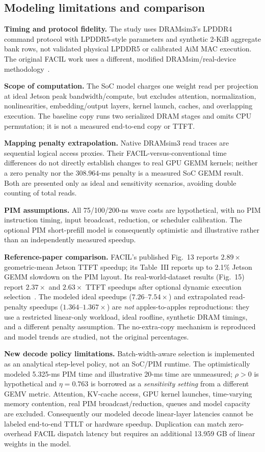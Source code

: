 \documentclass[conference,10pt]{IEEEtran}
\begin{document}
\subsection{Modeling limitations and comparison}
\textbf{Timing and protocol fidelity.} The study uses DRAMsim3's LPDDR4
command protocol with LPDDR5-style parameters and synthetic 2-KiB
aggregate bank rows, not validated physical LPDDR5 or calibrated
AiM MAC execution. The original FACIL work uses a different, modified
DRAMsim/real-device methodology~\cite{facil}.

\textbf{Scope of computation.} The SoC model charges one weight read
per projection at ideal Jetson peak bandwidth/compute, but excludes
attention, normalization, nonlinearities, embedding/output layers,
kernel launch, caches, and overlapping execution. The baseline copy
runs two serialized DRAM stages and omits CPU permutation; it is not a
measured end-to-end copy or TTFT.

\textbf{Mapping penalty extrapolation.} Native DRAMsim3 read traces
are sequential logical access proxies. Their FACIL-versus-conventional
time differences do not directly establish changes to real GPU GEMM
kernels; neither a zero penalty nor the $308.964$-ms penalty is a
measured SoC GEMM result. Both are presented only as ideal and
sensitivity scenarios, avoiding double counting of total reads.

\textbf{PIM assumptions.} All 75/100/200-ns wave costs are hypothetical,
with no PIM instruction timing, input broadcast, reduction, or scheduler
calibration. The optional PIM short-prefill model is consequently
optimistic and illustrative rather than an independently measured
speedup.

\textbf{Reference-paper comparison.} FACIL's published Fig.~13 reports
$2.89\times$ geometric-mean Jetson TTFT speedup; its Table~III
reports up to 2.1\% Jetson GEMM slowdown on the PIM layout. Its
real-world-dataset results (Fig.~15) report $2.37\times$ and
$2.63\times$ TTFT speedups after optional dynamic execution
selection~\cite{facil}. The modeled ideal speedups ($7.26$--$7.54\times$)
and extrapolated read-penalty speedups ($1.364$--$1.367\times$) are
\emph{not} apples-to-apples reproductions: they use a restricted
linear-only workload, ideal roofline, synthetic DRAM timings, and a
different penalty assumption. The no-extra-copy mechanism is reproduced
and model trends are studied, not the original percentages.

\textbf{New decode policy limitations.} Batch-width-aware selection
is implemented as an analytical step-level policy, not an SoC/PIM
runtime. The optimistically modeled 5.325-ms PIM time and illustrative
20-ms time are unmeasured; $\rho>0$ is hypothetical and $\eta=0.763$
is borrowed as a \emph{sensitivity setting} from a different GEMV
metric. Attention, KV-cache access, GPU kernel launches, time-varying
memory contention, real PIM broadcast/reduction, queues and model
capacity are excluded. Consequently our modeled decode linear-layer
latencies cannot be labeled end-to-end TTLT or hardware speedup.
Duplication can match zero-overhead FACIL dispatch latency but
requires an additional 13.959 GB of linear weights in the model.
\end{document}
